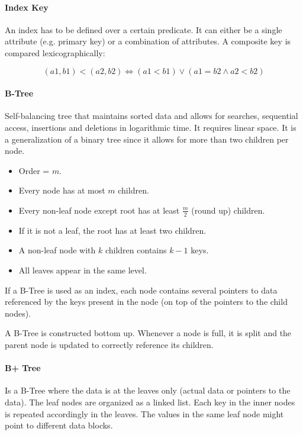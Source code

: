 \paragraph{Index Key}
An index has to be defined over a certain predicate. It can either be a single attribute (e.g. primary key) or a combination of attributes. A composite key is compared lexicographically:

$$
(a1,b1) < (a2,b2) \Longleftrightarrow (a1 < b1) \lor (a1 = b2 \land a2 < b2)
$$



\paragraph{B-Tree}
Self-balancing tree that maintains sorted data and allows for searches, sequential access, insertions and deletions in logarithmic time. It requires linear space. It is a generalization of a binary tree since it allows for more than two children per node.

\begin{itemize}
    \item Order = $m$.
    \item Every node has at most $m$ children.
    \item Every non-leaf node except root has at least $\frac{m}{2}$ (round up) children.
    \item If it is not a leaf, the root has at least two children.
    \item A non-leaf node with $k$ children contains $k-1$ keys.
    \item All leaves appear in the same level.
\end{itemize}

If a B-Tree is used as an index, each node contains several pointers to data referenced by the keys present in the node (on top of the pointers to the child nodes).


A B-Tree is constructed bottom up. Whenever a node is full, it is split and the parent node is updated to correctly reference its children.

\paragraph{B+ Tree}
Is a B-Tree where the data is at the leaves only (actual data or pointers to the data). The leaf nodes are organized as a linked list. Each key in the inner nodes is repeated accordingly in the leaves. The values in the same leaf node might point to different data blocks.

